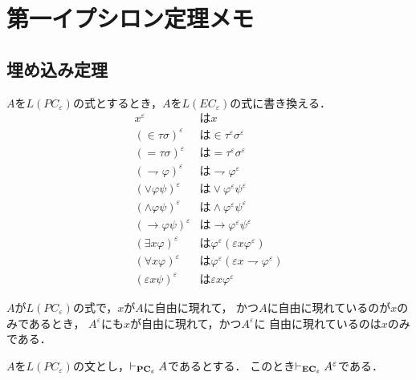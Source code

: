 \section{第一イプシロン定理メモ}
	
\subsection{埋め込み定理}
	$A$を$L(PC_{\varepsilon})$の式とするとき，$A$を$L(EC_{\varepsilon})$の式に書き換える．
	\begin{align}
		x^{\varepsilon} &\mbox{は} x \\
		(\in \tau \sigma)^{\varepsilon} &\mbox{は} \in \tau^{\varepsilon} \sigma^{\varepsilon} \\
		(= \tau \sigma)^{\varepsilon} &\mbox{は} = \tau^{\varepsilon} \sigma^{\varepsilon} \\
		(\rightharpoondown \varphi)^{\varepsilon} &\mbox{は} \rightharpoondown \varphi^{\varepsilon} \\
		(\vee \varphi \psi)^{\varepsilon} &\mbox{は} \vee \varphi^{\varepsilon} \psi^{\varepsilon} \\
		(\wedge \varphi \psi)^{\varepsilon} &\mbox{は} \wedge \varphi^{\varepsilon} \psi^{\varepsilon} \\
		(\rightarrow \varphi \psi)^{\varepsilon} &\mbox{は} \rightarrow \varphi^{\varepsilon} \psi^{\varepsilon} \\
		(\exists x \varphi)^{\varepsilon} &\mbox{は} \varphi^{\varepsilon}(\varepsilon x \varphi^{\varepsilon}) \\
		(\forall x \varphi)^{\varepsilon} &\mbox{は} \varphi^{\varepsilon}(\varepsilon x \rightharpoondown \varphi^{\varepsilon}) \\
		(\varepsilon x \psi)^{\varepsilon} &\mbox{は} \varepsilon x \varphi^{\varepsilon}
	\end{align}
	
	$A$が$L(PC_{\varepsilon})$の式で，$x$が$A$に自由に現れて，
	かつ$A$に自由に現れているのが$x$のみであるとき，
	$A^{\varepsilon}$にも$x$が自由に現れて，かつ$A^{\varepsilon}$に
	自由に現れているのは$x$のみである．
	
	\begin{screen}
		\begin{metathm}[埋め込み定理]
			$A$を$L(PC_{\varepsilon})$の文とし，$\vdash_{{\scriptsize \mbox{{\bf PC}${}_{\varepsilon}$}}} A$であるとする．
			このとき$\vdash_{{\scriptsize \mbox{{\bf EC}${}_{\varepsilon}$}}} A^{\varepsilon}$である．
		\end{metathm}
	\end{screen}
	
